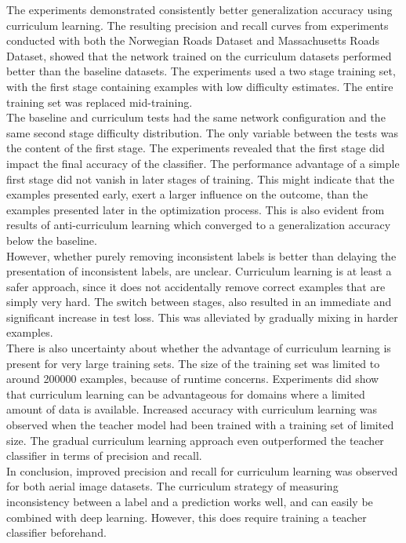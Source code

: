The experiments demonstrated consistently better generalization accuracy using curriculum learning. The resulting precision and recall curves from experiments conducted with both the Norwegian Roads Dataset and Massachusetts Roads Dataset, showed that the network trained on the curriculum datasets performed better than the baseline datasets. The experiments used a two stage training set, with the first stage containing examples with low difficulty estimates. The entire training set was replaced mid-training. \\

The baseline and curriculum tests had the same network configuration and the same second stage difficulty distribution. The only variable between the tests was the content of the first stage. The experiments revealed that the first stage did impact the final accuracy of the classifier. The performance advantage of a simple first stage did not vanish in later stages of training. This might indicate that the examples presented early, exert a larger influence on the outcome, than the examples presented later in the optimization process. This is also evident from results of anti-curriculum learning which converged to a generalization accuracy below the baseline. \\

However, whether purely removing inconsistent labels is  better than delaying the presentation of inconsistent labels, are  unclear. Curriculum learning is at least a safer approach, since it does not accidentally remove correct examples that are simply very hard. The switch between stages, also resulted in an immediate and significant increase in test loss. This was alleviated by gradually mixing in harder examples.\\

There is also uncertainty about whether the advantage of curriculum learning is present for very large training sets. The size of the training set was limited to around 200000 examples, because of runtime concerns. Experiments did show that curriculum learning can be advantageous for domains where a limited amount of data is available. Increased accuracy with curriculum learning was observed when the teacher model had been trained with a training set of limited size. The gradual curriculum learning approach even outperformed the teacher classifier in terms of precision and recall.\\

In conclusion, improved precision and recall for curriculum learning was observed for both aerial image datasets. The curriculum strategy of measuring inconsistency between a label and a prediction works well, and can easily be combined with deep learning. However, this does  require training a teacher classifier beforehand.


